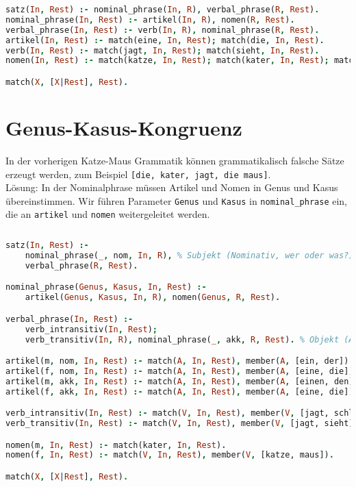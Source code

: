  $ $
\begin{lstlisting}[language=Prolog]
satz(In, Rest) :- nominal_phrase(In, R), verbal_phrase(R, Rest).
nominal_phrase(In, Rest) :- artikel(In, R), nomen(R, Rest).
verbal_phrase(In, Rest) :- verb(In, R), nominal_phrase(R, Rest).
artikel(In, Rest) :- match(eine, In, Rest); match(die, In, Rest).
verb(In, Rest) :- match(jagt, In, Rest); match(sieht, In, Rest).
nomen(In, Rest) :- match(katze, In, Rest); match(kater, In, Rest); match(maus, In, Rest).

match(X, [X|Rest], Rest).
\end{lstlisting}

\section{Genus-Kasus-Kongruenz}
In der vorherigen Katze-Maus Grammatik können grammatikalisch falsche Sätze erzeugt werden, zum Beispiel \lstinline`[die, kater, jagt, die maus]`.\\
Lösung: In der Nominalphrase müssen Artikel und Nomen in Genus und Kasus übereinstimmen. Wir führen Parameter \lstinline`Genus` und \lstinline`Kasus` in \lstinline`nominal_phrase` ein, die an \lstinline`artikel` und \lstinline`nomen` weitergeleitet werden. 

 $ $
\begin{lstlisting}[language=Prolog]
satz(In, Rest) :- 
	nominal_phrase(_, nom, In, R), % Subjekt (Nominativ, wer oder was?) 
	verbal_phrase(R, Rest).

nominal_phrase(Genus, Kasus, In, Rest) :- 
	artikel(Genus, Kasus, In, R), nomen(Genus, R, Rest).

verbal_phrase(In, Rest) :- 
	verb_intransitiv(In, Rest);
	verb_transitiv(In, R), nominal_phrase(_, akk, R, Rest). % Objekt (Akkusativ, wen oder was?)

artikel(m, nom, In, Rest) :- match(A, In, Rest), member(A, [ein, der]).
artikel(f, nom, In, Rest) :- match(A, In, Rest), member(A, [eine, die]).
artikel(m, akk, In, Rest) :- match(A, In, Rest), member(A, [einen, den]).
artikel(f, akk, In, Rest) :- match(A, In, Rest), member(A, [eine, die]).

verb_intransitiv(In, Rest) :- match(V, In, Rest), member(V, [jagt, schläft, rennt]).
verb_transitiv(In, Rest) :- match(V, In, Rest), member(V, [jagt, sieht]).

nomen(m, In, Rest) :- match(kater, In, Rest).
nomen(f, In, Rest) :- match(V, In, Rest), member(V, [katze, maus]).

match(X, [X|Rest], Rest).
\end{lstlisting}





